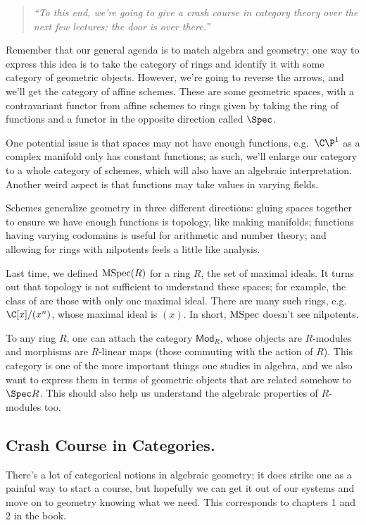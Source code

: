\begin{quote}\textit{
	``To this end, we're going to give a crash course in category theory over the next few lectures; the door is
	over there.''
}\end{quote}
Remember that our general agenda is to match algebra and geometry; one way to express this idea is to take the
category of rings and identify it with some category of geometric objects. However, we're going to reverse the
arrows, and we'll get the category of affine schemes. These are some geometric spaces, with a contravariant functor
from affine schemes to rings given by taking the ring of functions and a functor in the opposite direction called
\(\Spec\).

One potential issue is that spaces may not have enough functions, e.g.\ \(\C\P^1\) as a complex manifold only has
constant functions; as such, we'll enlarge our category to a whole category of schemes, which will also have an
algebraic interpretation. Another weird aspect is that functions may take values in varying fields.

Schemes generalize geometry in three different directions: gluing spaces together to ensure we have enough
functions is topology, like making manifolds; functions having varying codomains is useful for arithmetic and
number theory; and allowing for rings with nilpotents feels a little like analysis.

Last time, we defined \(\operatorname{MSpec}(R)\) for a ring \(R\), the set of maximal ideals. It turns out that topology is not
sufficient to understand these spaces; for example, the class of  are those with only one maximal
ideal. There are many such rings, e.g.\ \(\C[x]/(x^n)\), whose maximal ideal is \((x)\). In short, \(\operatorname{MSpec}\)
doesn't see nilpotents.

To any ring \(R\), one can attach the category \(\mathsf{Mod}_R\), whose objects are \(R\)-modules and morphisms
are \(R\)-linear maps (those commuting with the action of \(R\)). This category is one of the more important things
one studies in algebra, and we also want to express them in terms of geometric objects that are related somehow to
\(\Spec R\). This should also help us understand the algebraic properties of \(R\)-modules too.
\subsection*{Crash Course in Categories.}
There's a lot of categorical notions in algebraic geometry; it does strike one as a painful way to start a course,
but hopefully we can get it out of our systems and move on to geometry knowing what we need. This corresponds to
chapters 1 and 2 in the book.

